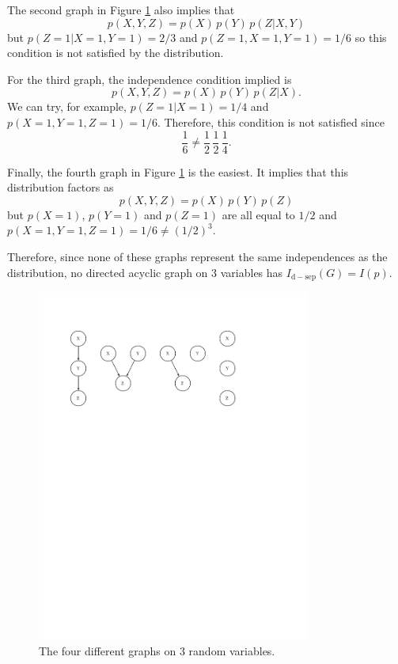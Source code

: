 \documentclass[11pt]{article}
\newcommand{\fig}[1]{Figure \ref{fig:#1}}
\newcommand{\figlabel}[1]{\label{fig:#1}}
\newcommand{\pr}[1]{\ensuremath{p(#1)}}
\begin{document}
The second graph in
\fig{gm2} also implies that
\begin{equation}
    \pr{X,Y,Z} = \pr{X} \, \pr{Y} \, \pr{Z | X,Y}
\end{equation}
but $\pr{Z = 1 | X = 1, Y = 1} = 2/3$ and $\pr{Z = 1, X = 1, Y = 1} = 1/6$
so this condition is not satisfied by the distribution.

For the third graph, the independence condition implied is
\begin{equation}
    \pr{X,Y,Z} = \pr{X} \, \pr{Y} \, \pr{Z | X}.
\end{equation}
We can try, for example, $\pr{Z = 1 | X = 1} = 1/4$ and
$\pr{X=1,Y=1,Z=1} = 1/6$. Therefore, this condition is not satisfied
since
\begin{equation}
    \frac{1}{6} \ne \frac{1}{2} \, \frac{1}{2} \, \frac{1}{4}.
\end{equation}

Finally, the fourth graph in \fig{gm2} is the easiest. It implies that this
distribution factors as
\begin{equation}
    \pr{X,Y,Z} = \pr{X} \, \pr{Y} \, \pr{Z}
\end{equation}
but \pr{X=1}, \pr{Y=1} and \pr{Z=1} are all equal to $1/2$ and
$\pr{X=1,Y=1,Z=1} = 1/6 \ne (1/2)^3$.

Therefore, since none of these graphs represent the same independences
as the distribution, no directed acyclic graph on 3 variables has
$I_\mathrm{d-sep} (G) = I(p)$.

\begin{figure}[hbtp]
    \centering
    \includegraphics[width=0.8\textwidth,%
        trim=1.9cm 18cm 4.8cm 3cm,clip=true]{gm/gm2.pdf}
    \caption{The four different graphs on 3 random variables. \figlabel{gm2}}
\end{figure}
\end{document}

